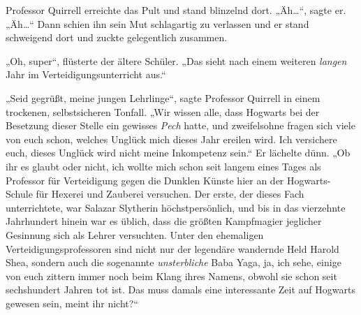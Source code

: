 Professor Quirrell erreichte das Pult und stand blinzelnd dort. „Äh…“, sagte er. „Äh…“ Dann schien ihn sein Mut schlagartig zu verlassen und er stand schweigend dort und zuckte gelegentlich zusammen.

„Oh, super“, flüsterte der ältere Schüler. „Das sieht nach einem weiteren \emph{langen} Jahr im Verteidigungsunterricht aus.“

„Seid gegrüßt, meine jungen Lehrlinge“, sagte Professor Quirrell in einem trockenen, selbstsicheren Tonfall. „Wir wissen alle, dass Hogwarts bei der Besetzung dieser Stelle ein gewisses \emph{Pech} hatte, und zweifelsohne fragen sich viele von euch schon, welches Unglück mich dieses Jahr ereilen wird. Ich versichere euch, dieses Unglück wird nicht meine Inkompetenz sein.“ Er lächelte dünn. „Ob ihr es glaubt oder nicht, ich wollte mich schon seit langem eines Tages als Professor für Verteidigung gegen die Dunklen Künste hier an der Hogwarts-Schule für Hexerei und Zauberei versuchen. Der erste, der dieses Fach unterrichtete, war Salazar Slytherin höchstpersönlich, und bis in das vierzehnte Jahrhundert hinein war es üblich, dass die größten Kampfmagier jeglicher Gesinnung sich als Lehrer versuchten. Unter den ehemaligen Verteidigungsprofessoren sind nicht nur der legendäre wandernde Held Harold Shea, sondern auch die sogenannte \emph{unsterbliche} Baba Yaga, ja, ich sehe, einige von euch zittern immer noch beim Klang ihres Namens, obwohl sie schon seit sechshundert Jahren tot ist. Das muss damals eine interessante Zeit auf Hogwarts gewesen sein, meint ihr nicht?“

